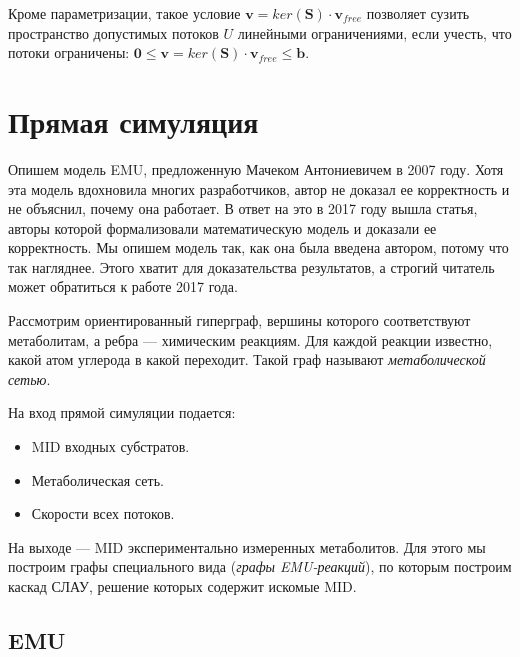 \documentclass[14pt, a4paper]{extreport}
\begin{document}
Кроме параметризации, такое условие $\mathbf{v} = ker(\mathbf{S}) \cdot \mathbf{v}_{free}$ позволяет сузить пространство допустимых потоков $U$ линейными ограничениями, если учесть, что потоки ограничены: $\mathbf{0} \le \mathbf{v} = ker(\mathbf{S}) \cdot \mathbf{v}_{free} \le \mathbf{b}$.



\clearpage
\section{Прямая симуляция}
Опишем модель EMU, предложенную Мачеком Антониевичем в 2007 году\cite{EMU_2007}. Хотя эта модель вдохновила многих разработчиков, автор не доказал ее корректность и не объяснил, почему она работает. В ответ на это в 2017 году вышла статья\cite{formalizm_2017}, авторы которой формализовали математическую модель и доказали ее корректность. Мы опишем модель так, как она была введена автором, потому что так нагляднее. Этого хватит для доказательства результатов, а строгий читатель может обратиться к работе 2017 года. 

Рассмотрим ориентированный гиперграф, вершины которого соответствуют метаболитам, а ребра --- химическим реакциям. Для каждой реакции известно, какой атом углерода в какой переходит. Такой граф называют \emph{метаболической сетью}.

На вход прямой симуляции подается:
\begin{itemize}
	\item MID входных субстратов.
	\item Метаболическая сеть.
	\item Скорости всех потоков.
\end{itemize}
На выходе --- MID экспериментально измеренных метаболитов.
Для этого мы построим графы специального вида (\emph{графы EMU-реакций}), по которым построим каскад СЛАУ, решение которых содержит искомые MID.

\subsection{EMU}
\end{document}
